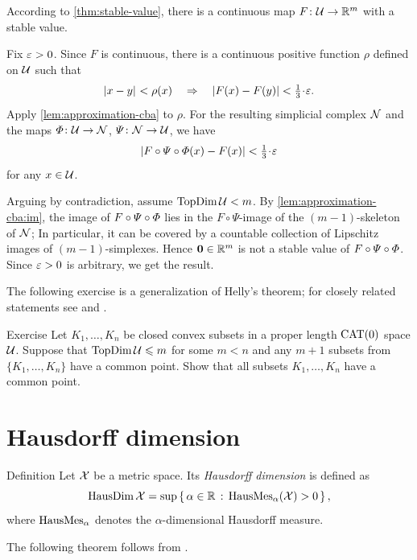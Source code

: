 According to \ref{thm:stable-value}, 
there is a continuous map $F\colon\mathcal{U}\to \mathbb{R}^m$ with a stable value.

Fix $\varepsilon>0$.
Since $F$ is continuous, there is a continuous positive function $\rho$ defined on $\mathcal{U}$ such that 
\[\dist{x}{y}{}<\rho(x)
\quad\Rightarrow\quad
|F(x)- F(y)|<\tfrac13\cdot\eps.\]
Apply \ref{lem:approximation-cba} to $\rho$.
For the resulting simplicial complex $\mathcal{N}$ 
 and the maps $\map\:\spc{U}\z\to \spc{N}$, $\varPsi\colon\mathcal{N}\to \mathcal{U}$, we have
\[|F\circ \Psi\circ\map(x)-F(x)|<\tfrac13\cdot\eps\] 
for any $x\in \mathcal{U}$.

Arguing by contradiction,
assume $\mathop{\rm TopDim}\nolimits\mathcal{U}<m$.
By \ref{lem:approximation-cba:im},
the image of $F\circ\varPsi\circ\varPhi$ lies in the $F\circ\Psi$-image of the $(m-1)$-skeleton of $\mathcal{N}$;
In particular, it can be covered by a countable collection of Lipschitz images of $(m-1)$-simplexes.
Hence
$\bm{0}\in \mathbb{R}^m$ is not a stable value of $F\circ\varPsi\circ\varPhi$.
Since $\varepsilon>0$ is arbitrary, we get the result.
\qeds

The following exercise is a generalization of Helly's theorem; for closely related statements see \cite[Prop. 5.3]{kleiner-1999} and \cite{ivanov2014}.


\begin{thm}{Exercise}\label{ex:helly}
Let $K_1,\ldots,K_n$ be closed convex subsets in a proper length $\mathrm{CAT}(0)$ space $\mathcal{U}$.
Suppose that $\mathop{\rm TopDim}\nolimits \mathcal{U}\leqslant m$ for some $m<n$ and any $m+1$ subsets from $\{K_1,\ldots, K_n\}$ have a common point.
Show that all subsets $K_1,\ldots,K_n$ have a common point.
\end{thm}

\section{Hausdorff dimension}

\begin{thm}{Definition}
\label{def:HausDim}
Let $\mathcal{X}$ be a metric space. 
Its \emph{Hausdorff dimension} is defined as
\[\mathop{\rm HausDim}\nolimits\mathcal{X}=\sup\left\{\,{\alpha\in\mathbb{R}}\,:\,{\mathop{\rm HausMes}\nolimits_\alpha(\mathcal{X})>0}\,\right\},\]
where $\mathop{\rm HausMes}\nolimits_\alpha$ denotes the $\alpha$-dimensional Hausdorff measure.
\end{thm}

The following theorem follows from \cite[theorems V 8 and VII 2]{hurewicz-wallman}.

